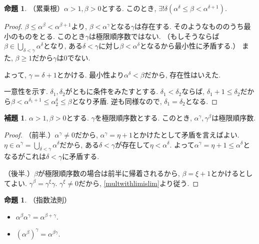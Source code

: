 \documentclass[a4paper, twoside]{bxjsarticle}
\theoremstyle{definition}
\newtheorem{prop}[thm]{命題}
\newtheorem{lem}[thm]{補題}
\begin{document}
        \begin{prop}
            （累乗根）$\alpha>1, \beta>0$とする. このとき, $\exists !\delta(\alpha^\delta\leq\beta<\alpha^{\delta+1})$.
        \end{prop}
        \begin{proof}
            $\beta\leq\alpha^\beta<\alpha^{\beta+1}$より, $\beta<\alpha^\gamma$となる$\gamma$は存在する. そのようなもののうち最小のものをとる. このとき$\gamma$は極限順序数ではない. （もしそうならば$\beta\in\bigcup_{\delta<\gamma}\alpha^\delta$となり, ある$\delta<\gamma$に対し$\beta<\alpha^\delta$となるから最小性に矛盾する.） また, $\beta\geq1$だから$\gamma$は0でない. 
            
            よって, $\gamma=\delta+1$とかける. 最小性より$\alpha^\delta<\beta$だから, 存在性はいえた.
            
            一意性を示す. $\delta_1, \delta_2$がともに条件をみたすとする. $\delta_1<\delta_2$ならば, $\delta_1+1\leq\delta_2$だから$\beta<\alpha^{\delta_1+1}\leq\alpha^\delta_2\leq\beta$となり矛盾. 逆も同様なので, $\delta_1=\delta_2$となる.
        \end{proof}
        \begin{lem}\label{powerlimislim}
            $\alpha>1, \beta>0$とする. $\gamma$を極限順序数とする. このとき, $\alpha^\gamma, \gamma^\beta$は極限順序数.
        \end{lem}
        \begin{proof}
            （前半.）$\alpha^\gamma\neq0$だから, $\alpha^\gamma=\eta+1$とかけたとして矛盾を言えばよい. $\eta\in\alpha^\gamma=\bigcup_{\delta<\gamma}\alpha^\delta$だから, ある$\delta<\gamma$が存在して$\eta<\alpha^\delta$. よって$\alpha^\gamma=\eta+1\leq\alpha^\delta$となるがこれは$\delta<\gamma$に矛盾する.
            
            （後半.）$\beta$が極限順序数の場合は前半に帰着されるから, $\beta=\xi+1$とかけるとしてよい. $\gamma^\beta=\gamma^\xi\gamma$. $\gamma^\xi\neq0$だから, \ref{multwithlimislim}より従う.
        \end{proof}
        \begin{prop}
            （指数法則）
            
            \begin{itemize}
                \item $\alpha^\beta \alpha^\gamma = \alpha^{\beta+\gamma}$.
                \item $(\alpha^\beta)^\gamma = \alpha^{\beta\gamma}$.
            \end{itemize}
        \end{prop}
\end{document}

